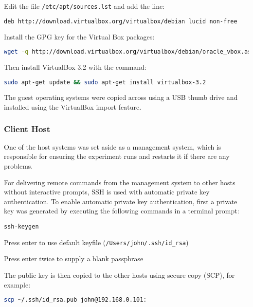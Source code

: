 \begin{enumerate*}
  \item Edit the file \verb+/etc/apt/sources.lst+ and add the line:
\begin{lstlisting}[language=sh]
deb http://download.virtualbox.org/virtualbox/debian lucid non-free
\end{lstlisting}
  \item Install the GPG key for the Virtual Box packages:
\begin{lstlisting}[language=sh]
wget -q http://download.virtualbox.org/virtualbox/debian/oracle_vbox.asc -O- | sudo apt-key add -
\end{lstlisting}
  \item Then install VirtualBox 3.2 with the command:
\begin{lstlisting}[language=sh]
sudo apt-get update && sudo apt-get install virtualbox-3.2
\end{lstlisting}
\end{enumerate*}

The guest operating systems were copied across using a USB thumb drive and
installed using the VirtualBox import feature.

\subsubsection{Client Host}

One of the host systems was set aside as a management system, which is
responsible for ensuring the experiment runs and restarts it if there are any
problems.

For delivering remote commands from the management system to other hosts without
interactive prompts, SSH is used with automatic private key authentication. To
enable automatic private key authentication, first a private key was generated
by executing the following commands in a terminal prompt:

\begin{enumerate*}
  \item \verb+ssh-keygen+
  \item Press enter to use default keyfile (\verb+/Users/john/.ssh/id_rsa+)
  \item Press enter twice to supply a blank passphrase
\end{enumerate*}

The public key is then copied to the other hosts using secure copy (SCP), for example:
\begin{lstlisting}[language=sh]
  scp ~/.ssh/id_rsa.pub john@192.168.0.101:
\end{lstlisting}

